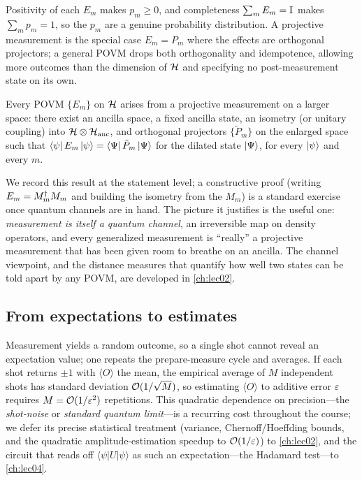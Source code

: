 Positivity of each $E_{m}$ makes $p_{m}\ge0$, and completeness $\sum_{m}E_{m}=\mathbb{I}$
makes $\sum_{m}p_{m}=1$, so the $p_{m}$ are a genuine probability distribution. A
projective measurement is the special case $E_{m}=P_{m}$ where the effects are
orthogonal projectors; a general POVM drops both orthogonality and idempotence,
allowing more outcomes than the dimension of $\mathcal{H}$ and specifying no
post-measurement state on its own.

\begin{theorem}\label{thm:lec01-naimark}
Every POVM $\{E_{m}\}$ on $\mathcal{H}$ arises from a projective measurement on a larger
space: there exist an ancilla space, a fixed ancilla state, an isometry (or unitary
coupling) into $\mathcal{H}\otimes\mathcal{H}_{\mathrm{anc}}$, and orthogonal projectors
$\{\tilde P_{m}\}$ on the enlarged space such that
$\bra{\psi}E_{m}\ket{\psi}=\bra{\Psi}\tilde P_{m}\ket{\Psi}$ for the dilated state
$\ket{\Psi}$, for every $\ket{\psi}$ and every $m$.
\end{theorem}

We record this result at the statement level; a constructive proof (writing
$E_{m}=M_{m}^{\dagger} M_{m}$ and building the isometry from the $M_{m}$) is a standard
exercise once quantum channels are in hand. The picture it justifies is the useful
one: \emph{measurement is itself a quantum channel}, an irreversible map on density
operators, and every generalized measurement is ``really'' a projective measurement
that has been given room to breathe on an ancilla. The channel viewpoint, and the
distance measures that quantify how well two states can be told apart by any POVM, are
developed in \cref{ch:lec02}.

\subsection{From expectations to estimates}

Measurement yields a random outcome, so a single shot cannot reveal an expectation
value; one repeats the prepare-measure cycle and averages. If each shot returns
$\pm1$ with $\langle O\rangle$ the mean, the empirical average of $M$ independent
shots has standard deviation $\mathcal{O}(1/\sqrt{M})$, so estimating $\langle O\rangle$ to
additive error $\varepsilon$ requires $M=\mathcal{O}(1/\varepsilon^{2})$ repetitions. This
quadratic dependence on precision---the \emph{shot-noise} or \emph{standard quantum
limit}---is a recurring cost throughout the course; we defer its precise statistical
treatment (variance, Chernoff/Hoeffding bounds, and the quadratic
amplitude-estimation speedup to $\mathcal{O}(1/\varepsilon)$) to \cref{ch:lec02}, and the
circuit that reads off $\langle\psi|U|\psi\rangle$ as such an expectation---the
Hadamard test---to \cref{ch:lec04}.

